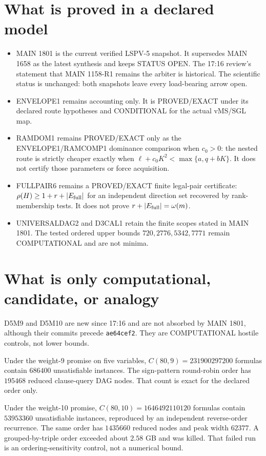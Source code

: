\documentclass[11pt]{article}
\begin{document}
\section*{What is proved in a declared model}
\begin{itemize}
\item MAIN 1801 is the current verified LSPV-5 snapshot. It supersedes MAIN 1658 as the
latest synthesis and keeps STATUS OPEN. The 17:16 review's statement that MAIN 1158-R1
remains the arbiter is historical. The scientific status is unchanged: both snapshots
leave every load-bearing arrow open.
\item ENVELOPE1 remains accounting only. It is PROVED/EXACT under its declared route
hypotheses and CONDITIONAL for the actual vMS/SGL map.
\item RAMDOM1 remains PROVED/EXACT only as the ENVELOPE1/RAMCOMP1 dominance comparison
when \(c_0>0\): the nested route is strictly cheaper exactly when
\(\ell+c_0K^2<\max\{a,q+bK\}\). It does not certify those parameters or force acquisition.
\item FULLPAIR6 remains a PROVED/EXACT finite legal-pair certificate:
\(\rho(H)\ge 1+r+|E_{\rm full}|\) for an independent direction set recovered by
rank-membership tests. It does not prove \(r+|E_{\rm full}|=\omega(m)\).
\item UNIVERSALDAG2 and D3CAL1 retain the finite scopes stated in MAIN 1801.
The tested ordered upper bounds \(720,2776,5342,7771\) remain COMPUTATIONAL and are
not minima.
\end{itemize}

\section*{What is only computational, candidate, or analogy}
D5M9 and D5M10 are new since 17:16 and are not absorbed by MAIN 1801, although their
commits precede \texttt{ae64cef2}. They are COMPUTATIONAL hostile controls, not lower bounds.

Under the weight-9 promise on five variables, \(C(80,9)=231900297200\) formulas contain
\(686400\) unsatisfiable instances. The sign-pattern round-robin order has \(195468\)
reduced clause-query DAG nodes. That count is exact for the declared order only.

Under the weight-10 promise, \(C(80,10)=1646492110120\) formulas contain
\(53953360\) unsatisfiable instances, reproduced by an independent reverse-order
recurrence. The same order has \(1435660\) reduced nodes and peak width \(62377\).
A grouped-by-triple order exceeded about \(2.58\) GB and was killed. That failed run is
an ordering-sensitivity control, not a numerical bound.
\end{document}
